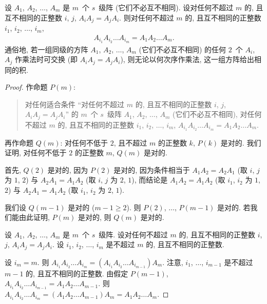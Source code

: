 \documentclass[../libro.tex]{subfiles}
\begin{document}
\begin{theorem}
    设 \(A_1\), \(A_2\), \(\dots\), \(A_m\)
    是 \(m\)~个 \(s\)~级阵
    (它们不必互不相同).
    设对任何不超过 \(m\) 的, 且互不相同的正整数 \(i\), \(j\),
    \(A_i A_j = A_j A_i\).
    则对任何不超过 \(m\) 的, 且互不相同的正整数
    \(i_1\), \(i_2\), \(\dots\), \(i_m\),
    \begin{align*}
        A_{i_1} A_{i_2} \dots A_{i_m}
        = A_1 A_2 \dots A_m.
    \end{align*}
    通俗地, 若一组同级的方阵
    \(A_1\), \(A_2\), \(\dots\), \(A_m\)
    (它们不必互不相同)
    的任何 \(2\)~个 \(A_i\), \(A_j\)
    作乘法时可交换
    (即 \(A_i A_j = A_j A_i\)),
    则无论以何次序作乘法, 这一组方阵给出相同的积.
\end{theorem}

\begin{proof}
    作命题 \(P(m)\):
    \begin{quotation}
        对任何适合条件
        ``对任何不超过 \(m\) 的, 且互不相同的正整数 \(i\), \(j\),
        \(A_i A_j = A_j A_i\)''
        的 \(m\)~个 \(s\)~级阵
        \(A_1\), \(A_2\), \(\dots\), \(A_m\)
        (它们不必互不相同),
        对任何不超过 \(m\) 的, 且互不相同的正整数
        \(i_1\), \(i_2\), \(\dots\), \(i_m\),
        \(A_{i_1} A_{i_2} \dots A_{i_m}
        = A_1 A_2 \dots A_m\).
    \end{quotation}
    再作命题 \(Q(m)\):
    对任何不低于 \(2\), 且不超过 \(m\) 的正整数 \(k\),
    \(P(k)\) 是对的.
    我们证明, 对任何不低于 \(2\) 的正整数 \(m\),
    \(Q(m)\) 是对的.

    首先, \(Q(2)\) 是对的, 因为 \(P(2)\) 是对的,
    因为条件相当于
    \(A_1 A_2 = A_2 A_1\)
    (取 \(i\), \(j\) 为 \(1\), \(2\))
    与 \(A_2 A_1 = A_1 A_2\)
    (取 \(i\), \(j\) 为 \(2\), \(1\)),
    而结论是 \(A_1 A_2 = A_1 A_2\)
    (取 \(i_1\), \(i_2\) 为 \(1\), \(2\))
    与 \(A_2 A_1 = A_1 A_2\)
    (取 \(i_1\), \(i_2\) 为 \(2\), \(1\)).

    我们设 \(Q(m-1)\) 是对的 (\(m - 1 \geq 2\)).
    则 \(P(2)\), \(\dots\), \(P(m-1)\) 是对的.
    若我们能由此证明, \(P(m)\) 是对的,
    则 \(Q(m)\) 是对的.

    设 \(A_1\), \(A_2\), \(\dots\), \(A_m\)
    是 \(m\)~个 \(s\)~级阵.
    设对任何不超过 \(m\) 的, 且互不相同的正整数 \(i\), \(j\),
    \(A_i A_j = A_j A_i\).
    设 \(i_1\), \(i_2\), \(\dots\), \(i_m\)
    是不超过 \(m\) 的, 且互不相同的正整数.

    设 \(i_m = m\).
    则 \(A_{i_1} A_{i_2} \dots A_{i_m}
    = (A_{i_1} A_{i_2} \dots A_{i_{m-1}}) A_{m}\).
    注意, \(i_1\), \(\dots\), \(i_{m-1}\)
    是不超过 \(m-1\) 的, 且互不相同的正整数.
    由假定 \(P(m-1)\),
    \(A_{i_1} A_{i_2} \dots A_{i_{m-1}}
    = A_1 A_2 \dots A_{m-1}\).
    则
    \(A_{i_1} A_{i_2} \dots A_{i_m}
        = (A_1 A_2 \dots A_{m-1}) A_{m}
    = A_1 A_2 \dots A_{m}\).


\end{proof}
\end{document}
